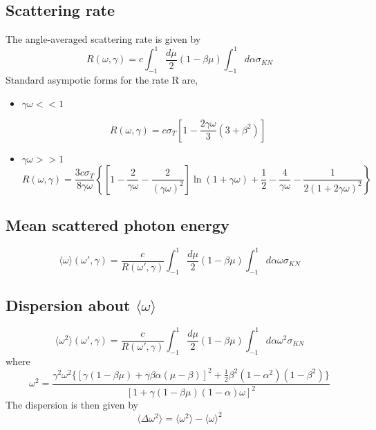 \documentclass[12pt]{book}
\begin{document}
\subsection{Scattering rate}
The angle-averaged scattering rate is given by
\begin{equation}
R(\omega,\gamma)=c\int_{-1}^{1}\frac{d\mu}{2}(1-\beta\mu)\int_{-1}^{1}d\alpha\sigma_{KN}
\end{equation}
Standard asympotic forms for the rate R are,
\begin{itemize}
\item $\gamma\omega<<1$

\begin{equation}
R(\omega,\gamma)=c\sigma_T\left[1-\frac{2\gamma\omega}{3}(3+\beta^2)\right]
\end{equation}
\item $\gamma\omega>>1$
\begin{equation}
R(\omega,\gamma)=\frac{3c\sigma_T}{8\gamma\omega}
\left\{\left[1-\frac{2}{\gamma\omega}-\frac{2}{(\gamma\omega)^2}\right]\ln(1+\gamma\omega)
+\frac{1}{2}-\frac{4}{\gamma\omega}-\frac{1}{2(1+2\gamma\omega)^2}\right\}
\end{equation}

\end{itemize}
\subsection{Mean scattered photon energy}
\begin{equation}
\langle\omega\rangle(\omega',\gamma)=\frac{c}{R(\omega',\gamma)}\int_{-1}^{1}\frac{d\mu}{2}(1-\beta\mu)
\int_{-1}^{1}d\alpha\omega\sigma_{KN}
\end{equation}
\subsection{Dispersion about $\langle\omega\rangle$}
\begin{equation}
\langle\omega^2\rangle(\omega',\gamma)=\frac{c}{R(\omega',\gamma)}\int_{-1}^{1}\frac{d\mu}{2}(1-\beta\mu)
\int_{-1}^{1}d\alpha\omega^2\sigma_{KN}
\end{equation}
where
\begin{equation}
\omega^2=\frac{\gamma^2\omega^2\{[\gamma(1-\beta\mu)+\gamma\beta\alpha(\mu-\beta)]^2
+\frac{1}{2}\beta^2(1-\alpha^2)(1-\beta^2)\}}{[1+\gamma(1-\beta\mu)(1-\alpha)\omega]^2}
\end{equation}
The dispersion is then given by
\begin{equation}
\langle\Delta\omega^2\rangle=\langle\omega^2\rangle-\langle\omega\rangle^2
\end{equation}
\end{document}

